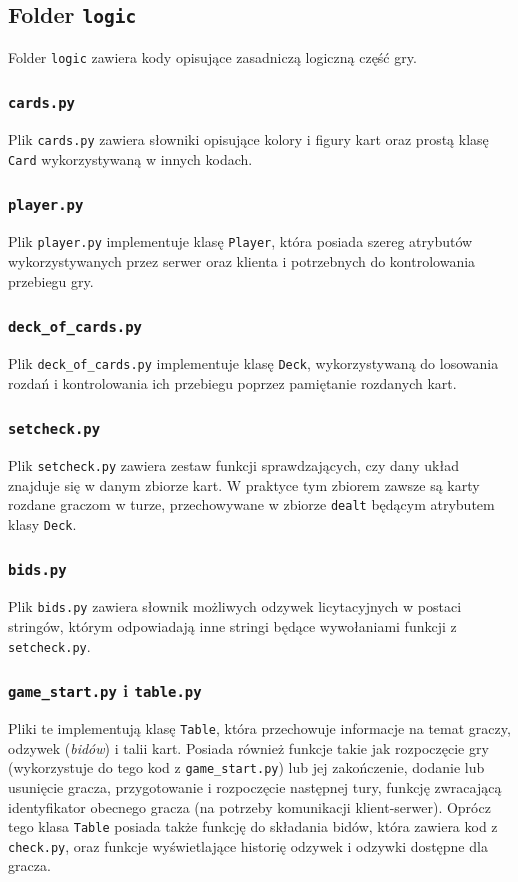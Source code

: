 \documentclass{article}
\begin{document}
\subsection{Folder \texttt{logic}}
Folder \texttt{logic} zawiera kody opisujące zasadniczą logiczną część gry.

\subsubsection{\texttt{cards.py}}
Plik \texttt{cards.py} zawiera słowniki opisujące kolory i figury kart oraz prostą klasę \texttt{Card} wykorzystywaną w innych kodach.

\subsubsection{\texttt{player.py}}
Plik \texttt{player.py} implementuje klasę \texttt{Player}, która posiada szereg atrybutów wykorzystywanych przez serwer oraz klienta i potrzebnych do kontrolowania przebiegu gry.

\subsubsection{\texttt{deck\_of\_cards.py}}
Plik \texttt{deck\_of\_cards.py} implementuje klasę \texttt{Deck}, wykorzystywaną do losowania rozdań i kontrolowania ich przebiegu poprzez pamiętanie rozdanych kart.

\subsubsection{\texttt{setcheck.py}}
Plik \texttt{setcheck.py} zawiera zestaw funkcji sprawdzających, czy dany układ znajduje się w danym zbiorze kart. W praktyce tym zbiorem zawsze są karty rozdane graczom w turze, przechowywane w zbiorze \texttt{dealt} będącym atrybutem klasy \texttt{Deck}.

\subsubsection{\texttt{bids.py}}
Plik \texttt{bids.py} zawiera słownik możliwych odzywek licytacyjnych w postaci stringów, którym odpowiadają inne stringi będące wywołaniami funkcji z \texttt{setcheck.py}.

\subsubsection{\texttt{game\_start.py} i \texttt{table.py}}
Pliki te implementują klasę \texttt{Table}, która przechowuje informacje na temat graczy, odzywek (\textit{bidów}) i talii kart. Posiada również funkcje takie jak rozpoczęcie gry (wykorzystuje do tego kod z \texttt{game\_start.py}) lub jej zakończenie, dodanie lub usunięcie gracza, przygotowanie i rozpoczęcie następnej tury, funkcję zwracającą identyfikator obecnego gracza (na potrzeby komunikacji klient-serwer). Oprócz tego klasa \texttt{Table} posiada także funkcję do składania  bidów, która zawiera kod z \texttt{check.py}, oraz funkcje wyświetlające historię odzywek i odzywki dostępne dla gracza.
\end{document}
